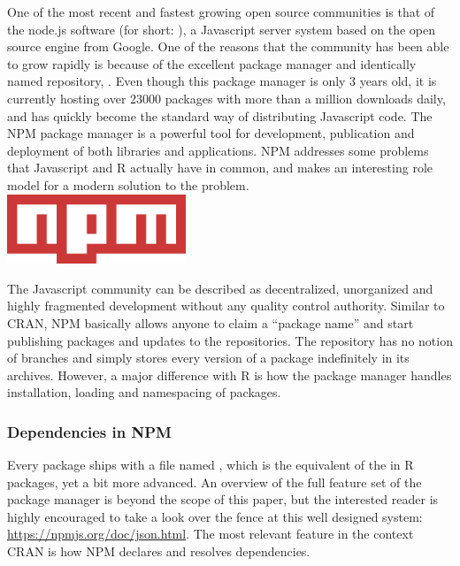 One of the most recent and fastest growing open source communities is that of
the node.js software (for short: ), a Javascript server system based
on the open source engine  from Google. One of the reasons that the
community has been able to grow rapidly is because of the excellent package
manager and identically named repository, . Even though this package
manager is only 3 years old, it is currently hosting over 23000 packages with
more than a million downloads daily, and has quickly become the standard
way of distributing Javascript code. The NPM package manager is a powerful tool
for development, publication and deployment of both libraries and applications.
NPM addresses some problems that Javascript and R actually have in common, and
makes an interesting role model for a modern solution to the problem.\\

\includegraphics[width=0.4\textwidth]{npm}

\noindent The Javascript community can be described as decentralized,
unorganized and highly fragmented development without any quality control authority. Similar to
CRAN, NPM basically allows anyone to claim a ``package name'' and start
publishing packages and updates to the repositories. The repository has no
notion of branches and simply stores every version of a package indefinitely in
its archives. However, a major difference with R is how the package manager
handles installation, loading and namespacing of packages.

\subsubsection{Dependencies in NPM}

Every  package ships with a file named , which is
the equivalent of the  in R packages, yet a bit more advanced.
An overview of the full feature set of the package manager is beyond the scope
of this paper, but the interested reader is highly encouraged to take a look
over the fence at this well designed system: \url{https://npmjs.org/doc/json.html}.
The most relevant feature in the context CRAN is how NPM declares and resolves
dependencies.

